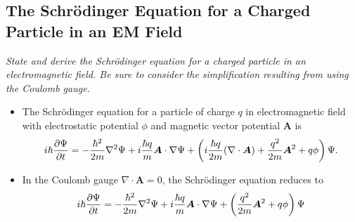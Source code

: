 \documentclass[11pt, a4paper]{article}
\renewcommand{\div}{\nabla \cdot}
\renewcommand{\grad}{\nabla}
\renewcommand{\laplacian}{\nabla^{2}}
\newcommand{\Schro}{Schr\"{o}dinger\xspace}
\renewcommand{\vec}[1]{\bm{#1}}  %
\newcommand{\A}{\vec{A}}  %
\renewcommand{\P}{\Psi}  %
\begin{document}
\subsection{The \Schro Equation for a Charged Particle in an EM Field}
\textit{State and derive the \Schro equation for a charged particle in an electromagnetic field. Be sure to consider the simplification resulting from using the Coulomb gauge.}

\begin{itemize}
    \item The \Schro equation for a particle of charge $ q $ in electromagnetic field with electrostatic potential $ \phi $ and magnetic vector potential $ \A $ is
	\begin{equation*}
		i \hbar \pdv{\P}{t} = -\frac{\hbar^{2}}{2m}\laplacian \P + i \frac{\hbar q}{m}\A \cdot \grad \P + \left(i\frac{\hbar q}{2m}(\div \A) + \frac{q^{2}}{2m}\A^{2} + q\phi\right)\P.
	\end{equation*}
	
    \item In the Coulomb gauge $ \div \A = 0 $, the \Schro equation reduces to
	\begin{equation*}
		i \hbar \pdv{\P}{t} = -\frac{\hbar^{2}}{2m}\laplacian \P + i \frac{\hbar q}{m}\A \cdot \grad \P + \left(\frac{q^{2}}{2m}\A^{2} + q\phi\right)\P
	\end{equation*}
\end{itemize}
\end{document}
